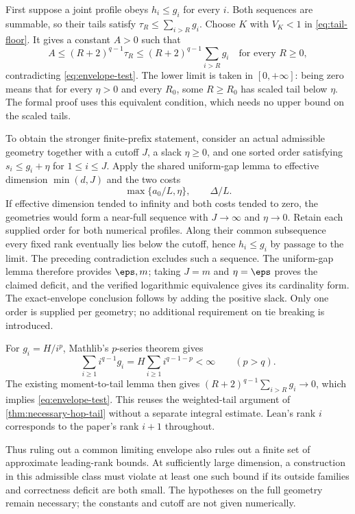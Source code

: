 \begin{outline}
First suppose a joint profile obeys $h_i\le g_i$ for every $i$.
Both sequences are summable, so their tails satisfy
$\tau_R\le\sum_{i>R}g_i$. Choose $K$ with $V_K<1$ in
\cref{eq:tail-floor}. It gives a constant $A>0$ such that
\[
 A\le(R+2)^{q-1}\tau_R
   \le(R+2)^{q-1}\sum_{i>R}g_i
 \quad\text{for every }R\ge0,
\]
contradicting \cref{eq:envelope-test}. The lower limit is taken in
$[0,+\infty]$: being zero means that for every $\eta>0$ and every
$R_0$, some $R\ge R_0$ has scaled tail below $\eta$. The formal proof
uses this equivalent condition, which needs no upper bound on the
scaled tails.

To obtain the stronger finite-prefix statement, consider an actual
admissible geometry together with a cutoff $J$, a slack $\eta\ge0$,
and one sorted order satisfying $s_i\le g_i+\eta$ for $1\le i\le J$.
Apply the shared uniform-gap lemma to effective dimension $\min(d,J)$
and the two costs
\[
 \max\{a_0/L,\eta\},\qquad \Delta/L.
\]
If effective dimension tended to infinity and both costs tended to zero,
the geometries would form a near-full sequence with $J\to\infty$ and
$\eta\to0$. Retain each supplied order for both numerical profiles.
Along their common subsequence every fixed rank eventually lies below
the cutoff, hence $h_i\le g_i$ by passage to the limit. The preceding
contradiction excludes such a sequence. The uniform-gap lemma therefore
provides $\eps,m$; taking $J=m$ and $\eta=\eps$ proves the claimed
deficit, and the verified logarithmic equivalence gives its cardinality
form. The exact-envelope conclusion follows by adding the positive slack.
Only one order is supplied per geometry; no additional requirement on
tie breaking is introduced.

For $g_i=H/i^p$, Mathlib's $p$-series theorem gives
\[
 \sum_{i\ge1}i^{q-1}g_i
   =H\sum_{i\ge1}i^{q-1-p}<\infty
 \qquad(p>q).
\]
The existing moment-to-tail lemma then gives
$(R+2)^{q-1}\sum_{i>R}g_i\to0$, which implies
\cref{eq:envelope-test}. This reuses the weighted-tail argument of
\cref{thm:necessary-hop-tail} without a separate integral estimate.
Lean's rank $i$ corresponds to the paper's rank $i+1$ throughout.
\end{outline}

Thus ruling out a common limiting envelope also rules out a finite set
of approximate leading-rank bounds. At sufficiently large dimension, a
construction in this admissible class must violate at least one such bound if its outside families and
correctness deficit are both small. The hypotheses on the full geometry
remain necessary; the constants and cutoff are not given numerically.


